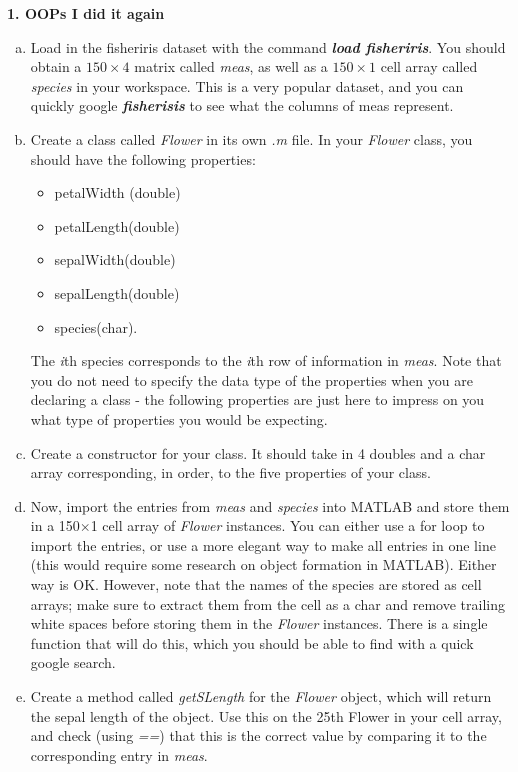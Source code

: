\documentclass[11pt]{article}
\begin{document}
\noindent
\newline
\textbf{1. OOPs I did it again}
\begin{enumerate}[a.]
	\item  Load in the fisheriris dataset with the command \textbf{\textit{load fisheriris}}.
	You should obtain a $150 \times 4$ matrix called \textit{meas},
	as well as a $150 \times 1$ cell array called \textit{species} in your workspace.
	This is a very popular dataset, 
	and you can quickly google \textit{\textbf{fisherisis}} to see what the columns of meas represent. 

	\item Create a class called \textit{Flower} in its own \textit{.m} file.
	In your \textit{Flower} class, you should have the following properties:
	\begin{itemize} 
		\item petalWidth (double)
		\item petalLength(double)
		\item sepalWidth(double)
		\item sepalLength(double)
		\item species(char).
	\end{itemize}
	The \textit{i}th species corresponds to the \textit{i}th row of information in \textit{meas}.
	Note that you do not need to specify the data type of the properties when
	you are declaring a class - the following properties are just here to impress on you what
	type of properties you would be expecting. 
	
	\item Create a constructor for your class.
	It should take in 4 doubles and a char array corresponding, in order,
	to the five properties of your class.
	
	\item Now, import the entries from \textit{meas} and \textit{species} into MATLAB and
	store them in a 150$\times$1 cell array of \textit{Flower} instances.
	You can either use a for loop to import the entries,
	or use a more elegant way to make all entries in one line
	(this would require some research on object formation in MATLAB).
	Either way is OK.
	However, note that the names of the species are stored as cell arrays;
	make sure to extract them from the cell as a char and remove trailing white spaces
	before storing them in the \textit{Flower} instances.
	There is a single function that will do this,
	which you should be able to find with a quick google search.

	\item Create a method called \textit{getSLength} for the \textit{Flower} object,
	which will return the sepal length of the object.
	Use this on the 25th Flower in your cell array, and check (using \textit{==})
	that this is the correct value by comparing it to the corresponding entry in \textit{meas}.
	

\end{enumerate}
\end{document}
